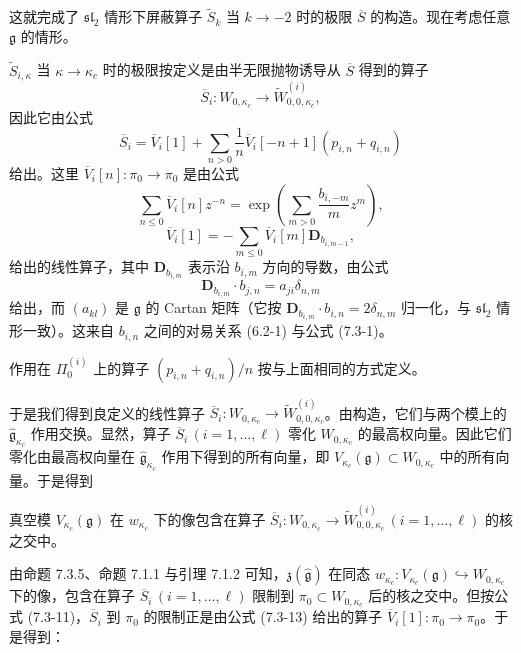这就完成了 $\mathfrak{sl}_2$ 情形下屏蔽算子 $\widetilde{S}_k$ 当 $k\to-2$ 时的极限 $\overline{S}$ 的构造。现在考虑任意 $\mathfrak{g}$ 的情形。

$\widetilde{S}_{i,\kappa}$ 当 $\kappa\to\kappa_c$ 时的极限按定义是由半无限抛物诱导从 $\overline{S}$ 得到的算子
\[
    \overline{S}_i:W_{0,\kappa_c}\longrightarrow\widetilde{W}_{0,0,\kappa_c}^{(i)},
\]
因此它由公式
\begin{equation}
    \overline{S}_i=\overline{V}_i[1]+\sum_{n>0}\frac{1}{n}\overline{V}_i[-n+1](p_{i,n}+q_{i,n})
    \tag{7.3-11}
\end{equation}
给出。这里 $\overline{V}_i[n]:\pi_0\to\pi_0$ 是由公式
\begin{equation}
    \sum_{n\le0}\overline{V}_i[n]z^{-n}=\exp\left(\sum_{m>0}\frac{b_{i,-m}}{m}z^m\right),
    \tag{7.3-12}
\end{equation}
\begin{equation}
    \overline{V}_i[1]=-\sum_{m\le0}\overline{V}_i[m]\mathbf{D}_{b_{i,m-1}},
    \tag{7.3-13}
\end{equation}
给出的线性算子，其中 $\mathbf{D}_{b_{i,m}}$ 表示沿 $b_{i,m}$ 方向的导数，由公式
\begin{equation}
    \mathbf{D}_{b_{i,m}}\cdot b_{j,n}=a_{ji}\delta_{n,m}
    \tag{7.3-14}
\end{equation}
给出，而 $(a_{kl})$ 是 $\mathfrak{g}$ 的 Cartan 矩阵（它按 $\mathbf{D}_{b_{i,m}}\cdot b_{i,n}=2\delta_{n,m}$ 归一化，与 $\mathfrak{sl}_2$ 情形一致）。这来自 $b_{i,n}$ 之间的对易关系 (6.2-1) 与公式 (7.3-1)。

作用在 $\Pi_0^{(i)}$ 上的算子 $(p_{i,n}+q_{i,n})/n$ 按与上面相同的方式定义。

于是我们得到良定义的线性算子 $\overline{S}_i:W_{0,\kappa_c}\to\widetilde{W}_{0,0,\kappa_c}^{(i)}$。由构造，它们与两个模上的 $\hat{\mathfrak{g}}_{\kappa_c}$ 作用交换。显然，算子 $\overline{S}_i\,(i=1,\dots,\ell)$ 零化 $W_{0,\kappa_c}$ 的最高权向量。因此它们零化由最高权向量在 $\hat{\mathfrak{g}}_{\kappa_c}$ 作用下得到的所有向量，即 $V_{\kappa_c}(\mathfrak{g})\subset W_{0,\kappa_c}$ 中的所有向量。于是得到

\begin{proposition}
    真空模 $V_{\kappa_c}(\mathfrak{g})$ 在 $w_{\kappa_c}$ 下的像包含在算子 $\overline{S}_i:W_{0,\kappa_c}\to\widetilde{W}_{0,0,\kappa_c}^{(i)}\,(i=1,\dots,\ell)$ 的核之交中。
\end{proposition}

由命题 7.3.5、命题 7.1.1 与引理 7.1.2 可知，$\mathfrak{z}(\hat{\mathfrak{g}})$ 在同态 $w_{\kappa_c}:V_{\kappa_c}(\mathfrak{g})\hookrightarrow W_{0,\kappa_c}$ 下的像，包含在算子 $\overline{S}_i\,(i=1,\dots,\ell)$ 限制到 $\pi_0\subset W_{0,\kappa_c}$ 后的核之交中。但按公式 (7.3-11)，$\overline{S}_i$ 到 $\pi_0$ 的限制正是由公式 (7.3-13) 给出的算子 $\overline{V}_i[1]:\pi_0\to\pi_0$。于是得到：

